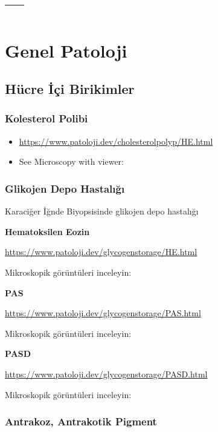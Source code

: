 \documentclass[
  letterpaper,
  DIV=11,
  numbers=noendperiod]{scrreprt}
\begin{document}
\part{---}

\part{Genel Patoloji}

\hypertarget{huxfccre-iuxe7i-birikimler}{%
\chapter{Hücre İçi Birikimler}\label{huxfccre-iuxe7i-birikimler}}

\hypertarget{kolesterol-polibi}{%
\section{Kolesterol Polibi}\label{kolesterol-polibi}}

\begin{itemize}
\item
  \url{https://www.patoloji.dev/cholesterolpolyp/HE.html}
\item
  See Microscopy with viewer:
\end{itemize}

\hypertarget{glikojen-depo-hastalux131ux11fux131}{%
\section{Glikojen Depo
Hastalığı}\label{glikojen-depo-hastalux131ux11fux131}}

Karaciğer İğnde Biyopsisinde glikojen depo hastalığı

\textbf{Hematoksilen Eozin}

\url{https://www.patoloji.dev/glycogenstorage/HE.html}

Mikroskopik görüntüleri inceleyin:

\textbf{PAS}

\url{https://www.patoloji.dev/glycogenstorage/PAS.html}

Mikroskopik görüntüleri inceleyin:

\textbf{PASD}

\url{https://www.patoloji.dev/glycogenstorage/PASD.html}

Mikroskopik görüntüleri inceleyin:

\hypertarget{antrakoz-antrakotik-pigment}{%
\section{Antrakoz, Antrakotik
Pigment}\label{antrakoz-antrakotik-pigment}}
\end{document}
